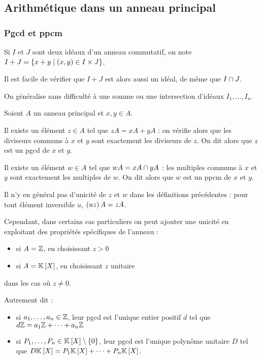 \subsection{Arithmétique dans un anneau principal}

\subsubsection{Pgcd et ppcm}

Si \(I\) et \(J\) sont deux idéaux d'un anneau commutatif, on note \(I+J=\left\lbrace x+y\;\middle|\;\left(x,y\right)\in I\times J\right\rbrace\).

Il est facile de vérifier que \(I+J\) est alors aussi un idéal, de même que \(I\cap J\).

On généralise sans difficulté à une somme ou une intersection d'idéaux \(I_1,\dots,I_n\).

\begin{prop}
Soient \(A\) un anneau principal et \(x,y\in A\).

Il existe un élément \(z\in A\) tel que \(zA=xA+yA\) : on vérifie alors que les diviseurs communs à \(x\) et \(y\) sont exactement les diviseurs de \(z\). On dit alors que \(z\) est un pgcd de \(x\) et \(y\).

Il existe un élément \(w\in A\) tel que \(wA=xA\cap yA\) : les multiples communs à \(x\) et \(y\) sont exactement les multiples de \(w\). On dit alors que \(w\) est un ppcm de \(x\) et \(y\).
\end{prop}

Il n'y en général pas d'unicité de \(z\) et \(w\) dans les définitions précédentes : pour tout élément inversible \(u\), \(\left(uz\right)A=zA\).

Cependant, dans certains cas particuliers on peut ajouter une unicité en exploitant des propriétés spécifiques de l'anneau :

\begin{itemize}
    \item si \(A=\mathbb{Z}\), en choisissant \(z>0\) \\
    \item si \(A=\poly\), en choisissant \(z\) unitaire
\end{itemize}

dans les cas où \(z\not=0\).

Autrement dit :

\begin{itemize}
    \item si \(a_1,\dots,a_n\in\mathbb{Z}\), leur pgcd est l'unique entier positif \(d\) tel que \(d\mathbb{Z}=a_1\mathbb{Z}+\dots+a_n\mathbb{Z}\) \\
    \item si \(P_1,\dots,P_n\in\poly\excluant\accol{0}\), leur pgcd est l'unique polynôme unitaire \(D\) tel que \(D\poly=P_1\poly+\dots+P_n\poly\).
\end{itemize}

